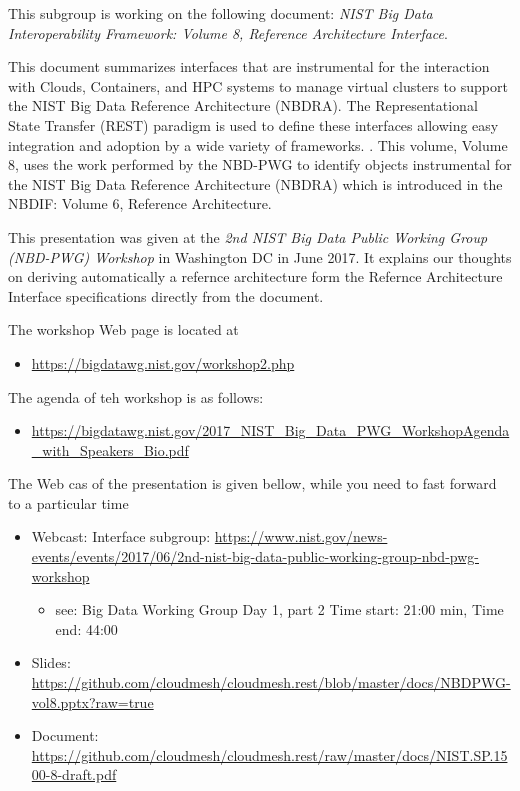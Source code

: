 This subgroup is working on the following document: \emph{NIST Big Data
Interoperability Framework: Volume 8, Reference Architecture Interface}.

This document summarizes interfaces that are instrumental for the
interaction with Clouds, Containers, and HPC systems to manage virtual
clusters to support the NIST Big Data Reference Architecture (NBDRA).
The Representational State Transfer (REST) paradigm is used to define
these interfaces allowing easy integration and adoption by a wide
variety of frameworks. . This volume, Volume 8, uses the work performed
by the NBD-PWG to identify objects instrumental for the NIST Big Data
Reference Architecture (NBDRA) which is introduced in the NBDIF: Volume
6, Reference Architecture.

This presentation was given at the \emph{2nd NIST Big Data Public
Working Group (NBD-PWG) Workshop} in Washington DC in June 2017. It
explains our thoughts on deriving automatically a refernce architecture
form the Refernce Architecture Interface specifications directly from
the document.

The workshop Web page is located at

\begin{itemize}
\item
  \url{https://bigdatawg.nist.gov/workshop2.php}
\end{itemize}

The agenda of teh workshop is as follows:

\begin{itemize}
\item
  \url{https://bigdatawg.nist.gov/2017_NIST_Big_Data_PWG_WorkshopAgenda_with_Speakers_Bio.pdf}
\end{itemize}

The Web cas of the presentation is given bellow, while you need to fast
forward to a particular time

\begin{itemize}
\item
  Webcast: Interface subgroup:
  \url{https://www.nist.gov/news-events/events/2017/06/2nd-nist-big-data-public-working-group-nbd-pwg-workshop}

  \begin{itemize}
    \item
    see: Big Data Working Group Day 1, part 2 Time start: 21:00 min,
    Time end: 44:00
  \end{itemize}
\item
  Slides:
  \url{https://github.com/cloudmesh/cloudmesh.rest/blob/master/docs/NBDPWG-vol8.pptx?raw=true}
\item
  Document:
  \url{https://github.com/cloudmesh/cloudmesh.rest/raw/master/docs/NIST.SP.1500-8-draft.pdf}
\end{itemize}

